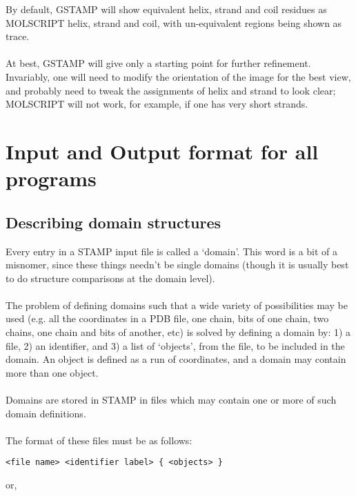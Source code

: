 By default, GSTAMP will show equivalent helix, strand and coil residues
as MOLSCRIPT \al helix, \be strand and coil, with un-equivalent regions 
being shown as \Cal trace.\\
\\
At best, GSTAMP will give only a starting point for further refinement.  
Invariably, one will need to modify the orientation of the image for the 
best view, and probably need to tweak the assignments of helix and strand 
to look clear; MOLSCRIPT will not work, for example, if one has very 
short \be strands.

\chapter{Input and Output format for all programs}

\section{Describing domain structures}

Every entry in a STAMP input file is called a `domain'.  This word
is a bit of a misnomer, since these things needn't be single domains
(though it is usually best to do structure comparisons at the domain level).\\
\\
The problem of defining domains such that a wide variety of 
possibilities may be used (e.g. all the coordinates in a PDB file,
one  chain, bits of one chain, two chains, one chain and bits of
another, etc) is solved by defining a domain by: 1) a file, 2) an
identifier, and 3) a list of `objects', from the file, to be
included in the domain.  An object is defined as a run of \Cal
coordinates, and a domain may contain more than one object.\\
\\
Domains are stored in STAMP in files which may contain one or
more of such domain definitions.\\
\\
The format of these files must be as follows:\\

\begin{scriptsize}\begin{verbatim}
<file name> <identifier label> { <objects> }
\end{verbatim} \end{scriptsize}

or,\\

